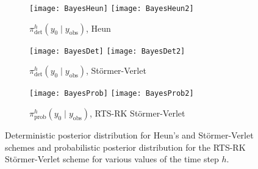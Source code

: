 \documentclass{siamart1116}
\numberwithin{theorem}{section}
\begin{document}
\begin{figure}
\begin{subfigure}{\textwidth}
	\centering
	\texttt{[image: BayesHeun]}
	\texttt{[image: BayesHeun2]}
	\caption{$\pi^h_{\mathrm{det}}(y_0\mid y_{\mathrm{obs}})$, Heun}
	\label{fig:BayesA}
\end{subfigure}	
\begin{subfigure}{\textwidth}
	\centering
	\texttt{[image: BayesDet]}
	\texttt{[image: BayesDet2]}
	\caption{$\pi^h_{\mathrm{det}}(y_0\mid y_{\mathrm{obs}})$, Störmer-Verlet}
	\label{fig:BayesB}
\end{subfigure}
\begin{subfigure}{\textwidth}
	\centering
	\texttt{[image: BayesProb]}
	\texttt{[image: BayesProb2]}
	\caption{$\pi^h_{\mathrm{prob}}(y_0\mid y_{\mathrm{obs}})$, RTS-RK Störmer-Verlet}
	\label{fig:BayesC}
\end{subfigure}
\caption{Deterministic posterior distribution for Heun's and Störmer-Verlet schemes and probabilistic posterior distribution for the RTS-RK Störmer-Verlet scheme for various values of the time step $h$.}
\label{fig:Bayes}
\end{figure}



\end{document}

